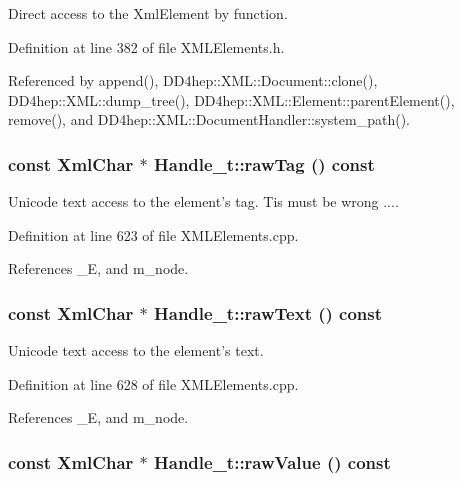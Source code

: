 Direct access to the XmlElement by function. 

Definition at line 382 of file XMLElements.h.

Referenced by append(), DD4hep::XML::Document::clone(), DD4hep::XML::dump\_\-tree(), DD4hep::XML::Element::parentElement(), remove(), and DD4hep::XML::DocumentHandler::system\_\-path().\hypertarget{class_d_d4hep_1_1_x_m_l_1_1_handle__t_a8b0a2f06da75cd065a84dd0ebcb70b27}{
\subsubsection[{rawTag}]{\setlength{\rightskip}{0pt plus 5cm}const {\bf XmlChar} $\ast$ Handle\_\-t::rawTag () const}}
\label{class_d_d4hep_1_1_x_m_l_1_1_handle__t_a8b0a2f06da75cd065a84dd0ebcb70b27}


Unicode text access to the element's tag. Tis must be wrong .... 

Definition at line 623 of file XMLElements.cpp.

References \_\-E, and m\_\-node.\hypertarget{class_d_d4hep_1_1_x_m_l_1_1_handle__t_abb57bc0eb49a7b0c2ebc6d9e34547c56}{
\subsubsection[{rawText}]{\setlength{\rightskip}{0pt plus 5cm}const {\bf XmlChar} $\ast$ Handle\_\-t::rawText () const}}
\label{class_d_d4hep_1_1_x_m_l_1_1_handle__t_abb57bc0eb49a7b0c2ebc6d9e34547c56}


Unicode text access to the element's text. 

Definition at line 628 of file XMLElements.cpp.

References \_\-E, and m\_\-node.\hypertarget{class_d_d4hep_1_1_x_m_l_1_1_handle__t_a6dfd5ec05f926fd5aec1e5dd163f3577}{
\subsubsection[{rawValue}]{\setlength{\rightskip}{0pt plus 5cm}const {\bf XmlChar} $\ast$ Handle\_\-t::rawValue () const}}
\label{class_d_d4hep_1_1_x_m_l_1_1_handle__t_a6dfd5ec05f926fd5aec1e5dd163f3577}



